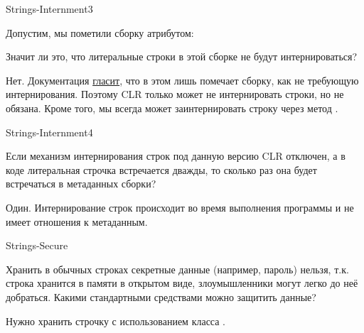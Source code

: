 \begin{defproblem}{Strings-Internment3}
\begin{onlyproblem}
  Допустим, мы пометили сборку атрибутом:
  \begin{source}
  \end{source}
  Значит ли это, что литеральные строки в этой сборке не будут интернироваться?
\end{onlyproblem}
\begin{onlysolution}
  Нет. Документация \href{http://msdn.microsoft.com/en-us/library/system.runtime.compilerservices.compilationrelaxations.aspx}{гласит}, что в этом  лишь помечает сборку, как не требующую интернирования. Поэтому CLR только может не интернировать строки, но не обязана. Кроме того, мы всегда может заинтернировать строку через метод .
\end{onlysolution}
\end{defproblem}
\begin{defproblem}{Strings-Internment4}
\begin{onlyproblem}
  Если механизм интернирования строк под данную версию CLR отключен, а в коде литеральная строчка  встречается дважды, то сколько раз она будет встречаться в метаданных сборки?
\end{onlyproblem}
\begin{onlysolution}
  Один. Интернирование строк происходит во время выполнения программы и не имеет отношения к метаданным.
\end{onlysolution}
\end{defproblem}
\begin{defproblem}{Strings-Secure}
\begin{onlyproblem}
  Хранить в обычных строках секретные данные (например, пароль) нельзя, т.к. строка хранится в памяти в открытом виде, злоумышленники могут легко до неё добраться. Какими стандартными средствами можно защитить данные?
\end{onlyproblem}
\begin{onlysolution}
  Нужно хранить строчку с использованием класса .
\end{onlysolution}
\end{defproblem}
